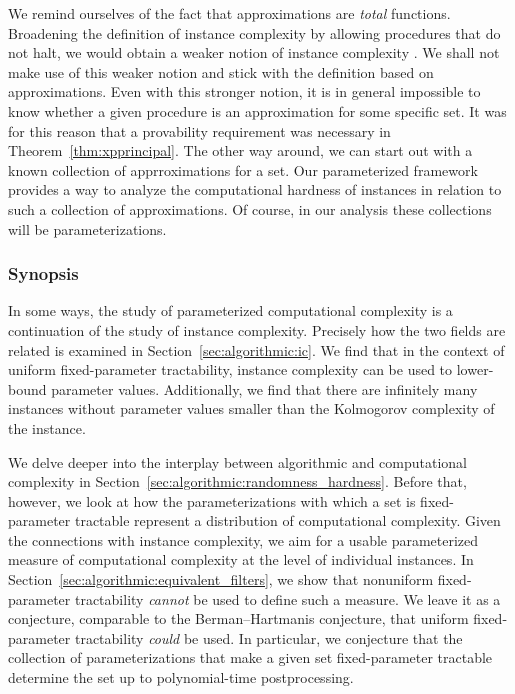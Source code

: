 We remind ourselves of the fact that approximations are \emph{total} functions.
Broadening the definition of instance complexity by allowing procedures that do not halt, we would obtain a weaker notion of instance complexity \parencite{kummer1996kolmogorov}.
We shall not make use of this weaker notion and stick with the definition based on approximations.
Even with this stronger notion, it is in general impossible to know whether a given procedure is an approximation for some specific set.
It was for this reason that a provability requirement was necessary in Theorem~\ref{thm:xpprincipal}.
The other way around, we can start out with a known collection of apprroximations for a set.
Our parameterized framework provides a way to analyze the computational hardness of instances in relation to such a collection of approximations.
Of course, in our analysis these collections will be parameterizations.

\subsubsection{Synopsis}
In some ways, the study of parameterized computational complexity is a continuation of the study of instance complexity.
Precisely how the two fields are related is examined in Section~\ref{sec:algorithmic:ic}.
We find that in the context of uniform fixed-parameter tractability, instance complexity can be used to lower-bound parameter values.
Additionally, we find that there are infinitely many instances without parameter values smaller than the Kolmogorov complexity of the instance.

We delve deeper into the interplay between algorithmic and computational complexity in Section~\ref{sec:algorithmic:randomness_hardness}.
Before that, however, we look at how the parameterizations with which a set is fixed-parameter tractable represent a distribution of computational complexity.
Given the connections with instance complexity, we aim for a usable parameterized measure of computational complexity at the level of individual instances.
In Section~\ref{sec:algorithmic:equivalent_filters}, we show that nonuniform fixed-parameter tractability \emph{cannot} be used to define such a measure.
We leave it as a conjecture, comparable to the Berman--Hartmanis conjecture, that uniform fixed-parameter tractability \emph{could} be used.
In particular, we conjecture that the collection of parameterizations that make a given set fixed-parameter tractable determine the set up to polynomial-time postprocessing.

